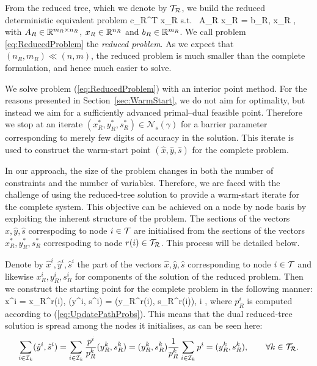 From the reduced tree, which we denote by $\mathcal{T}_\mathcal{R}$, 
we build the reduced deterministic 
equivalent problem
\be \label{eq:ReducedProblem}
\min\; c_R^T x_R \;\quad \mbox{s.t. }\; A_R x_R = b_R, \; x_R ,
\ee
with $A_R \in \mathbb{R}^{m_R\times n_R}$, $x_R \in 
\mathbb{R}^{n_R}$ and $b_R \in \mathbb{R}^{m_R}$. 
We call problem \eqref{eq:ReducedProblem} the {\em reduced problem}.
As we expect that $(n_R, m_R) \ll (n, m)$, the reduced problem is 
much smaller than the complete formulation, and hence much easier to solve.

We solve problem (\ref{eq:ReducedProblem}) with an interior point method. 
For the reasons presented in Section~\ref{sec:WarmStart}, we do not 
aim for optimality, but instead we aim for a sufficiently advanced 
primal--dual feasible point. Therefore we stop at an iterate
$(x_R^*,y_R^*,s_R^*)\in\mathcal{N}_s(\gamma)$ for a
barrier parameter corresponding to merely few digits of accuracy 
in the solution.
This iterate is used to construct the warm-start point
$(\hat{x}, \hat{y}, \hat{s})$ for the complete problem.

In our approach, the size of the problem changes in both 
the number of constraints and the number of variables.
Therefore, we are faced with the challenge of using 
the reduced-tree solution to provide a warm-start iterate for 
the complete system.
This objective can be achieved on a node by node basis 
by exploiting the inherent structure of the problem.
The sections of the vectors
$\hat{x}, \hat{y}, \hat{s}$ correspoding to node $i\in\mathcal{T}$ are
initialised from the sections of the vectors 
$x_R^*,y_R^*,s_R^*$ correspoding to node $r(i)\in\mathcal{T}_\mathcal{R}$. This process
will be detailed below.

Denote by $\hat x^{i}, \hat y^{i}, \hat s^{i}$ the part of the vectors
$\hat{x}, \hat{y}, \hat{s}$ corresponding to node $i\in\mathcal{T}$ and likewise
$x_R^{i}, y_R^{i},  s_R^{i}$ for components of the solution of the
reduced problem. Then we construct the starting point for the complete
problem in the following manner:
\be  \label{eq:WarmstartSolution}
  \hat x^{i} = x_R^{r(i)}, \qquad 
 (\hat y^{i}, \hat s^{i}) =  (y_R^{r(i)}, s_R^{r(i)}),
  \qquad\forall i \in \Ctree,
\ee
where $p^i_R$ is computed according to (\ref{eq:UpdatePathProbs}).
This means that the dual reduced-tree solution is spread among the
nodes it initialises, as can be seen here:
\[
   \sum_{i \in \mathcal{I}_k} (\hat y^i, \hat s^i)
  = \sum_{i \in \mathcal{I}_k} \frac{p^i}{p^k_R} (y^k_R, s^k_R)
  = (y^k_R, s^k_R) \frac{1}{p^k_R} \sum_{i \in \mathcal{I}_k} p^i 
  = (y^k_R, s^k_R), \qquad\forall k \in \mathcal{T}_\mathcal{R}.
\]

